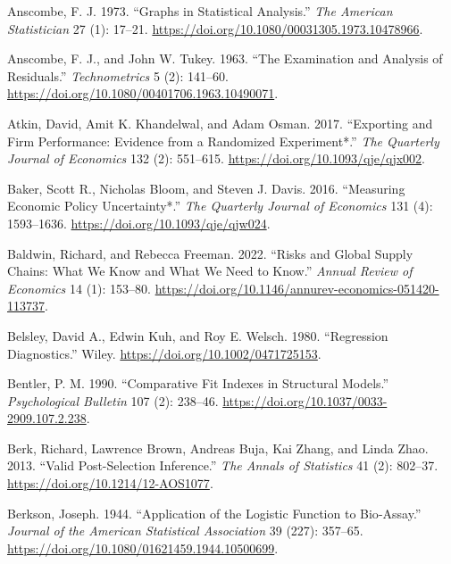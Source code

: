 \documentclass[
  letterpaper,
  10pt,
  twoside,
  openright,
  numbers=noenddot,
  chapterprefix=true]{scrbook}
\newlength{\cslhangindent}
\newenvironment{CSLReferences}[2] %
 {\begin{list}{}{%
  \setlength{\itemindent}{0pt}
  \setlength{\leftmargin}{0pt}
  \setlength{\parsep}{0pt}
  \ifodd #1
   \setlength{\leftmargin}{\cslhangindent}
   \setlength{\itemindent}{-1\cslhangindent}
  \fi
  \setlength{\itemsep}{#2\baselineskip}}}
 {\end{list}}
\begin{document}
\begin{CSLReferences}{1}{0}
Anscombe, F. J. 1973. {``{Graphs} in {Statistical} {Analysis}.''}
\emph{{The} {American} {Statistician}} 27 (1): 17--21.
\url{https://doi.org/10.1080/00031305.1973.10478966}.

Anscombe, F. J., and John W. Tukey. 1963. {``{The} {Examination} and
{Analysis} of {Residuals}.''} \emph{{Technometrics}} 5 (2): 141--60.
\url{https://doi.org/10.1080/00401706.1963.10490071}.

Atkin, David, Amit K. Khandelwal, and Adam Osman. 2017. {``{Exporting}
and {Firm} {Performance}: {Evidence} from a {Randomized}
{Experiment}*.''} \emph{{The} {Quarterly} {Journal} of {Economics}} 132
(2): 551--615. \url{https://doi.org/10.1093/qje/qjx002}.

Baker, Scott R., Nicholas Bloom, and Steven J. Davis. 2016.
{``{Measuring} {Economic} {Policy} {Uncertainty}*.''} \emph{{The}
{Quarterly} {Journal} of {Economics}} 131 (4): 1593--1636.
\url{https://doi.org/10.1093/qje/qjw024}.

Baldwin, Richard, and Rebecca Freeman. 2022. {``{Risks} and {Global}
{Supply} {Chains}: {What} {We} {Know} and {What} {We} {Need} to
{Know}.''} \emph{{Annual} {Review} of {Economics}} 14 (1): 153--80.
\url{https://doi.org/10.1146/annurev-economics-051420-113737}.

Belsley, David A., Edwin Kuh, and Roy E. Welsch. 1980. {``{Regression}
{Diagnostics}.''} {Wiley}. \url{https://doi.org/10.1002/0471725153}.

Bentler, P. M. 1990. {``{Comparative} Fit Indexes in Structural
Models.''} \emph{{Psychological} {Bulletin}} 107 (2): 238--46.
\url{https://doi.org/10.1037/0033-2909.107.2.238}.

Berk, Richard, Lawrence Brown, Andreas Buja, Kai Zhang, and Linda Zhao.
2013. {``{Valid} Post-Selection Inference.''} \emph{{The} {Annals} of
{Statistics}} 41 (2): 802--37. \url{https://doi.org/10.1214/12-AOS1077}.

Berkson, Joseph. 1944. {``{Application} of the {Logistic} {Function} to
{Bio}-{Assay}.''} \emph{{Journal} of the {American} {Statistical}
{Association}} 39 (227): 357--65.
\url{https://doi.org/10.1080/01621459.1944.10500699}.


\end{CSLReferences}
\end{document}
